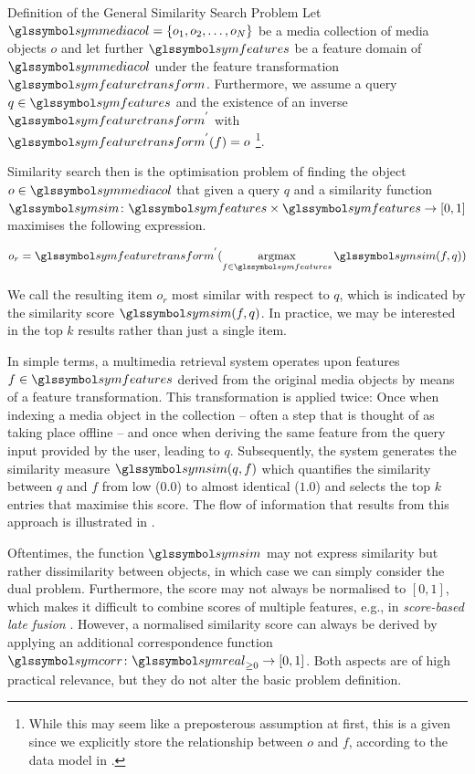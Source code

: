 \begin{definition}[label=definition:similarity_search]{Definition of the General Similarity Search Problem}{}
    Let $\symmediacol = \lbrace o_1, o_2, \ldots, o_N \rbrace$ be a media collection of media objects $o$ and let further $\symfeatures$ be a feature domain of $\symmediacol$ under the feature transformation $\symfeaturetransform$. Furthermore, we assume a query $q \in \symfeatures$ and the existence of an inverse $\symfeaturetransform^{'}$ with $\symfeaturetransform^{'}(f) = o$ \footnote{While this may seem like a preposterous assumption at first, this is a given since we explicitly store the relationship between $o$ and $f$, according to the data model in .}.

    Similarity search then is the optimisation problem of finding the object $o \in \symmediacol$ that given a query $q$ and a similarity function $\symsim \colon \symfeatures \times \symfeatures \rightarrow [0, 1]$ maximises the following expression.

    \begin{equation}
       o_r =  \symfeaturetransform^{'} (\argmax_{f \in \symfeatures} \symsim(f,q))
    \end{equation}
 
    We call the resulting item $o_r$ most similar with respect to $q$, which is indicated by the similarity score $\symsim(f,q)$. In practice, we may be interested in the top $k$ results rather than just a single item.
\end{definition}

In simple terms, a multimedia retrieval system operates upon features $f \in \symfeatures$ derived from the original media objects by means of a feature transformation. This transformation is applied twice: Once when indexing a media object in the collection -- often a step that is thought of as taking place offline -- and once when deriving the same feature from the query input provided by the user, leading to $q$. Subsequently, the system generates the similarity measure $\symsim(q,f)$ which quantifies the similarity between $q$ and $f$ from low ($0.0$) to almost identical ($1.0$) and selects the top $k$ entries that maximise this score. The flow of information that results from this approach is illustrated in . 

Oftentimes, the function $\symsim$ may not express similarity but rather dissimilarity between objects, in which case we can simply consider the dual problem. Furthermore, the score may not always be normalised to $[0, 1]$, which makes it difficult to combine scores of multiple features, e.g., in \emph{score-based late fusion} \cite{Depeursinge:2010Fusion,Rossetto:2018Multi}. However, a normalised similarity score can always be derived by applying an additional correspondence function $\symcorr \colon \symreal_{\geq 0} \rightarrow [0, 1]$. Both aspects are of high practical relevance, but they do not alter the basic problem definition. 

